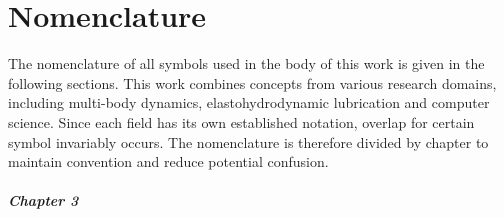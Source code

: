 
\chapter*{Nomenclature}

The nomenclature of all symbols used in the body of this work is given in the following sections. This work combines concepts from various research domains, including multi-body dynamics, elastohydrodynamic lubrication and computer science. Since each field has its own established notation, overlap for certain symbol invariably occurs. The nomenclature is therefore divided by chapter to maintain convention and reduce potential confusion.

\paragraph{Chapter 3}

